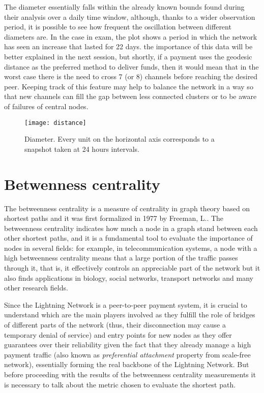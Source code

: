 	The diameter essentially falls within the already known bounds found during their analysis over a daily time window, although, thanks to a wider observation period, it is possible to see how frequent the oscillation between different diameters are. In the case in exam, the plot shows a period in which the network has seen an increase that lasted for 22 days. the importance of this data will be better explained in the next session, but shortly, if a payment uses the geodesic distance as the preferred method to deliver funds, then it would mean that in the worst case there is the need to cross 7 (or 8) channels before reaching the desired peer. Keeping track of this feature may help to balance the network in a way so that new channels can fill the gap between less connected clusters or to be aware of failures of central nodes.
	
	\begin{figure}
		\centering
		\texttt{[image: distance]}
		\caption{Diameter. Every unit on the horizontal axis corresponds to a snapshot taken at 24 hours intervals.}
		\label{monthly_diameter}
	\end{figure}

	\section{Betwenness	centrality}
	\label{sec:betweenness}
	
	The betweenness centrality is a measure of centrality in graph theory based on shortest paths and it was first formalized in 1977 by Freeman, L.\cite{Freeman1977}. The betweenness centrality indicates how much a node in a graph stand between each other shortest paths, and it is a fundamental tool to evaluate the importance of nodes in several fields: for example, in telecommunication systems, a node with a high betweenness centrality means that a large portion of the traffic passes through it, that is, it effectively controls an appreciable part of the network but it also finds applications in biology, social networks, transport networks and many other research fields. 
	
	Since the Lightning Network is a peer-to-peer payment system, it is crucial to understand which are the main players involved as they fulfill the role of bridges of different parts of the network (thus, their disconnection may cause a temporary denial of service) and entry points for new nodes as they offer guarantees over their reliability given the fact that they already manage a high payment traffic (also known as \textit{preferential attachment} property from scale-free network), essentially forming the real backbone of the Lightning Network. But before proceeding with the results of the betweenness centrality measurements it is necessary to talk about the metric chosen to evaluate the shortest path.
	
